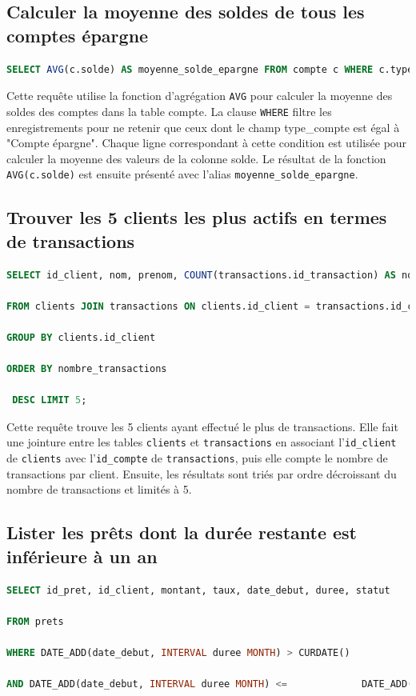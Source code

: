 \documentclass[12pt,a4paper]{article}
\begin{document}
	\subsection{Calculer la moyenne des soldes de tous les comptes épargne}

\begin{lstlisting}[language=SQL]
SELECT AVG(c.solde) AS moyenne_solde_epargne FROM compte c WHERE c.type_compte = 'Compte epargne'; 
\end{lstlisting}

\vspace{.5cm}

Cette requête utilise la fonction d'agrégation \texttt{AVG} pour calculer la moyenne des soldes des comptes dans la table compte. La clause \texttt{WHERE} filtre les enregistrements pour ne retenir que ceux dont le champ type\_compte est égal à "Compte épargne". Chaque ligne correspondant à cette condition est utilisée pour calculer la moyenne des valeurs de la colonne solde. Le résultat de la fonction \texttt{AVG(c.solde)} est ensuite présenté avec l'alias \texttt{moyenne\_solde\_epargne}. 

	\subsection{Trouver les 5 clients les plus actifs en termes de transactions}
	
	
\begin{lstlisting}[language=SQL]
SELECT id_client, nom, prenom, COUNT(transactions.id_transaction) AS nombre_transactions  

FROM clients JOIN transactions ON clients.id_client = transactions.id_compte  

GROUP BY clients.id_client  

ORDER BY nombre_transactions 

 DESC LIMIT 5; 
\end{lstlisting}	

\vspace{.5cm}

Cette requête trouve les 5 clients ayant effectué le plus de transactions. Elle fait une jointure entre les tables \texttt{clients} et \texttt{transactions} en associant l'\texttt{id\_client} de  \texttt{clients} avec l'\texttt{id\_compte} de \texttt{transactions}, puis elle compte le nombre de transactions par client. Ensuite, les résultats sont triés par ordre décroissant du nombre de transactions et limités à 5. 

	\subsection{Lister les prêts dont la durée restante est inférieure à un an}
\begin{lstlisting}[language=SQL]
SELECT id_pret, id_client, montant, taux, date_debut, duree, statut  

FROM prets  

WHERE DATE_ADD(date_debut, INTERVAL duree MONTH) > CURDATE()  

AND DATE_ADD(date_debut, INTERVAL duree MONTH) <= 		      DATE_ADD(CURDATE(), INTERVAL 12 MONTH); 
\end{lstlisting}
\end{document}
